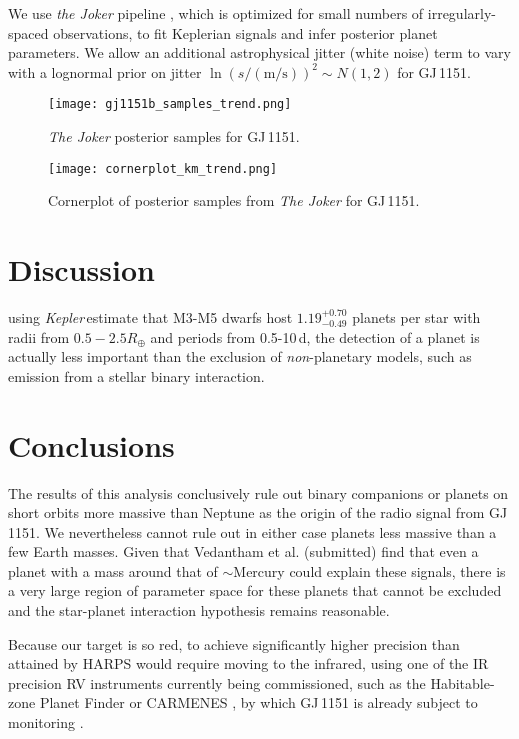 \documentclass[modern]{aastex62}
\newcommand\kepler{\emph{Kepler}\,}
\begin{document}
We use \textit{the Joker} pipeline \citep{joker}, which is optimized for small numbers of irregularly-spaced observations, to fit Keplerian signals and infer posterior planet parameters. We allow an additional astrophysical jitter (white noise) term to vary with a lognormal prior on jitter $\ln {(s/(\text{m/s}))^2} \sim {N}(1,2)$ for GJ\,1151.

\begin{figure}
\noindent\texttt{[image: gj1151b\_samples\_trend.png]}

\caption{\label{jokermodel1151}
\textit{The Joker} posterior samples for GJ\,1151.
}
\end{figure}


\begin{figure}
\noindent\texttt{[image: cornerplot\_km\_trend.png]}

\caption{\label{cornerplot}
Cornerplot of posterior samples from \textit{The Joker} for GJ\,1151.
}
\end{figure}

\section{Discussion}
\label{sec:discussion}

\citet{2019arXiv190505900H} using \kepler estimate that M3-M5 dwarfs host $1.19^{+0.70}_{−0.49}$ planets per star with radii from $0.5-2.5 R_\oplus$ and periods from  0.5-10\,d, the detection of a planet is actually less important than the exclusion of \emph{non}-planetary models, such as emission from a stellar binary interaction.

\section{Conclusions}
\label{sec:conclusions}

The results of this analysis conclusively rule out binary companions or planets on short orbits more massive than Neptune as the origin of the radio signal from GJ\,1151. We nevertheless cannot rule out in either case planets less massive than a few Earth masses. Given that Vedantham et al. (submitted) find that even a planet with a mass around that of $\sim$Mercury could explain these signals, there is a very large region of parameter space for these planets that cannot be excluded and the star-planet interaction hypothesis remains reasonable. 

Because our target is so red, to achieve significantly higher precision than attained by HARPS would require moving to the infrared, using one of the IR precision RV instruments currently being commissioned, such as the Habitable-zone Planet Finder \citep[HPF:][]{hpf} or CARMENES \citep{carmenes}, by which GJ\,1151 is already subject to monitoring \citep{carmenesinput}.
\end{document}
